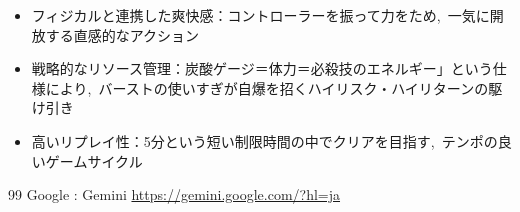\documentclass[dvipdfmx]{jsarticle}
\begin{document}
\begin{itemize}
\item フィジカルと連携した爽快感：コントローラーを振って力をため,\ 一気に開放する直感的なアクション
\item 戦略的なリソース管理：炭酸ゲージ＝体力＝必殺技のエネルギー」という仕様により,\ バーストの使いすぎが自爆を招くハイリスク・ハイリターンの駆け引き
\item 高いリプレイ性：5分という短い制限時間の中でクリアを目指す,\ テンポの良いゲームサイクル
\end{itemize}

\begin{thebibliography}{99}
%
 Google : Gemini \url{https://gemini.google.com/?hl=ja}
%

\end{thebibliography}
\end{document}
